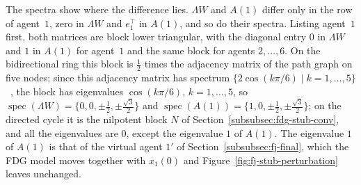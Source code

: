 The spectra show where the difference lies. $\Lambda W$ and
$A(1)$ differ only in the row of agent~$1$, zero in $\Lambda W$ and $e_1^\top$ in
$A(1)$, and so do their spectra. Listing agent~$1$ first, both matrices are block lower
triangular, with the diagonal entry $0$ in $\Lambda W$ and $1$ in $A(1)$ for agent~$1$
and the same block for agents $2, \dots, 6$. On the bidirectional ring this block is
$\tfrac12$ times the adjacency matrix of the path graph on five nodes; since this
adjacency matrix has spectrum $\{2\cos(k\pi/6) \mid k = 1, \dots, 5\}$~\cite{bullo2024lns},
the block has eigenvalues $\cos(k\pi/6)$, $k = 1, \dots, 5$, so
$\operatorname{spec}(\Lambda W) = \{0, 0, \pm\tfrac12, \pm\tfrac{\sqrt3}{2}\}$ and
$\operatorname{spec}(A(1)) = \{1, 0, \pm\tfrac12, \pm\tfrac{\sqrt3}{2}\}$; on the
directed cycle it is the nilpotent block $N$ of
Section~\ref{subsubsec:fdg-stub-conv}, and all the eigenvalues are $0$, except the
eigenvalue $1$ of $A(1)$.
 The eigenvalue $1$ of $A(1)$ is that of the virtual agent $1'$ of
Section~\ref{subsubsec:fj-final}, which the FDG model moves together with $x_1(0)$ and
Figure~\ref{fig:fj-stub-perturbation} leaves unchanged.

